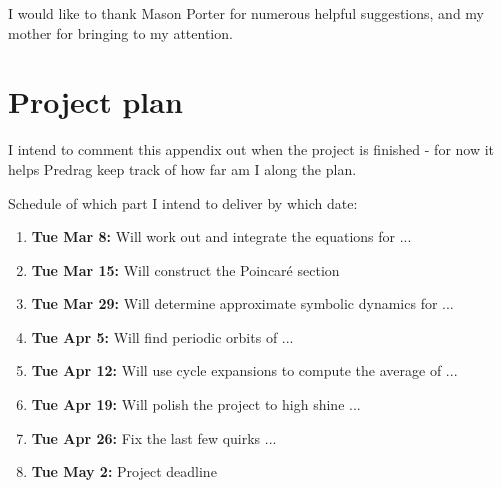 \documentclass[pre,twocolumn,groupedaddress,showpacs,showkeys]{revtex4}
\begin{document}
\begin{acknowledgments}

I would like to thank Mason Porter for 
numerous helpful suggestions, and
my mother for bringing  
to my attention.

\end{acknowledgments}         

\appendix

\section{Project plan}
\label{appe:plan}

I intend to comment this appendix out when the project is finished
- for now it helps Predrag keep track of how far am I along the
plan.

Schedule of which part I  intend to deliver by which date:

\begin{enumerate}
	   \item{\bf Tue Mar 8:}
Will work out and integrate the equations for  ...
	   \item{\bf  Tue Mar 15:}
Will construct the Poincar\'e section
	   \item{\bf  Tue Mar 29:}
Will determine approximate symbolic dynamics for ...
	   \item{\bf  Tue Apr  5:}
Will find periodic orbits of ...
	   \item{\bf  Tue Apr 12:}
Will use cycle expansions to compute the average of ...
	   \item{\bf  Tue Apr 19:}
Will polish the project to high shine ...
	   \item{\bf  Tue Apr 26:}
Fix the last few quirks ...
	   \item{\bf  Tue May 2:}
Project deadline
\end{enumerate}




\end{document}
